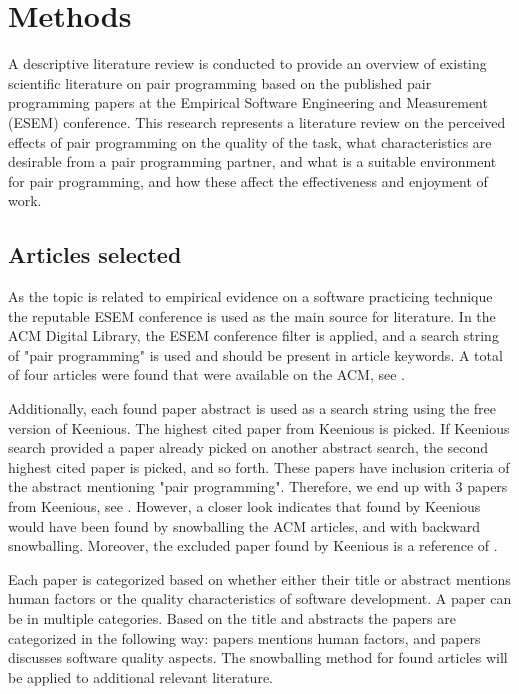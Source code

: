 \documentclass[conference]{IEEEtran}
\begin{document}
\section{Methods}

A descriptive literature review is conducted to provide an overview of existing scientific literature on pair programming based on the published pair programming papers at the Empirical Software Engineering and Measurement (ESEM) conference. This research represents a literature review on the perceived effects of pair programming on the quality of the task, what characteristics are desirable from a pair programming partner, and what is a suitable environment for pair programming, and how these affect the effectiveness and enjoyment of work. 

\subsection{Articles selected}

As the topic is related to empirical evidence on a software practicing technique the reputable ESEM conference is used as the main source for literature. In the ACM Digital Library, the ESEM conference filter is applied, and a search string of "pair programming" is used and should be present in article keywords. A total of four articles were found that were available on the ACM, see \cite{10.1145/2652524.2652529, 10.1145/1414004.1414026, 10.1145/1852786.1852816, 10.1145/1159733.1159749}.

Additionally, each found paper abstract is used as a search string using the free version of Keenious. The highest cited paper from Keenious is picked. If Keenious search provided a paper already picked on another abstract search, the second highest cited paper is picked, and so forth. These papers have inclusion criteria of the abstract mentioning "pair programming". Therefore, we end up with 3 papers from Keenious, see \cite{Williams2000Strengthening, Arisholm2007Evaluating, Hannay2009effectiveness}. However, a closer look indicates that \cite{Williams2000Strengthening, Arisholm2007Evaluating} found by Keenious would have been found by snowballing the ACM articles, and \cite{Hannay2009effectiveness} with backward snowballing. Moreover, the excluded paper \cite{ChamorroPremuzic2003Personality} found by Keenious is a reference of \cite{10.1145/1852786.1852816}.

Each paper is categorized based on whether either their title or abstract mentions human factors or the quality characteristics of software development. A paper can be in multiple categories. Based on the title and abstracts the papers are categorized in the following way: papers \cite{10.1145/2652524.2652529, Williams2000Strengthening, 10.1145/1414004.1414026, 10.1145/1852786.1852816} mentions human factors, and papers \cite{Williams2000Strengthening, 10.1145/1414004.1414026, Arisholm2007Evaluating, 10.1145/1159733.1159749, Hannay2009effectiveness} discusses software quality aspects. The snowballing method for found articles will be applied to additional relevant literature.
\end{document}
